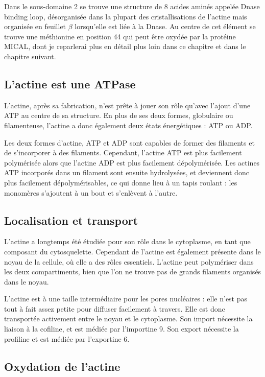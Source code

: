 Dans le sous-domaine 2 se trouve une structure de 8 acides aminés appelée Dnase binding loop, désorganisée dans la plupart des cristallisations de l'actine mais organisée en feuillet $\beta$ lorsqu'elle est liée à la Dnase. Au centre de cet élément se trouve une méthionine en position 44 qui peut être oxydée par la protéine MICAL, dont je reparlerai plus en détail plus loin dans ce chapitre et dans le chapitre suivant. 

\subsection{L'actine est une ATPase}

L'actine, après sa fabrication, n'est prête à jouer son rôle qu'avec l'ajout d'une ATP au centre de sa structure.
En plus de ses deux formes, globulaire ou filamenteuse, l'actine a donc également deux états énergétiques : ATP ou ADP.

Les deux formes d'actine, ATP et ADP sont capables de former des filaments et de s'incorporer à des filaments. 
Cependant, l'actine ATP est plus facilement polymérisée alors que l'actine ADP est plus facilement dépolymérisée. 
Les actines ATP incorporés dans un filament sont ensuite hydrolysées, et deviennent donc plus facilement dépolymérisables, ce qui donne lieu à un tapis roulant : les monomères s'ajoutent à un bout et s'enlèvent à l'autre. 

\subsection{Localisation et transport}

L'actine a longtemps été étudiée pour son rôle dans le cytoplasme, en tant que composant du cytosquelette. Cependant de l'actine est également présente dans le noyau de la cellule, où elle a des rôles essentiels. 
L'actine peut polymériser dans les deux compartiments, bien que l'on ne trouve pas de grands filaments organisés dans le noyau. 

L'actine est à une taille intermédiaire pour les pores nucléaires : elle n'est pas tout à fait assez petite pour diffuser facilement à travers. Elle est donc transportée activement entre le noyau et le cytoplasme. 
Son import nécessite la liaison à la cofiline, et est médiée par l'importine 9. Son export nécessite la profiline et est médiée par l'exportine 6. 



\subsection{Oxydation de l'actine}

